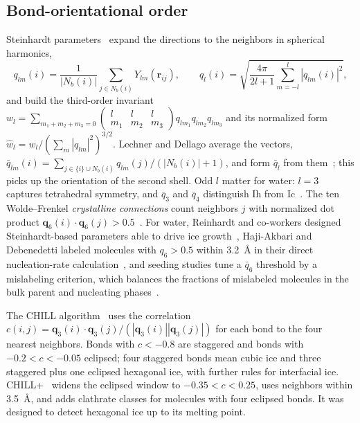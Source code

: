 \documentclass[11pt,a4paper]{article}
\begin{document}
\subsection{Bond-orientational order}\label{sec:boo}
Steinhardt parameters~\cite{Steinhardt1983} expand the directions to the
neighbors in spherical harmonics,
\begin{equation}
  q_{lm}(i)=\frac{1}{|N_b(i)|}\sum_{j\in N_b(i)}Y_{lm}(\hat{\mathbf r}_{ij}),\qquad
  q_l(i)=\sqrt{\frac{4\pi}{2l+1}\sum_{m=-l}^{l}|q_{lm}(i)|^2},
\end{equation}
and build the third-order invariant
$w_l=\sum_{m_1+m_2+m_3=0}\begin{pmatrix}l&l&l\\m_1&m_2&m_3\end{pmatrix}q_{lm_1}q_{lm_2}q_{lm_3}$
and its normalized form $\hat w_l=w_l/(\sum_m|q_{lm}|^2)^{3/2}$. Lechner and
Dellago average the vectors,
$\bar q_{lm}(i)=\sum_{j\in\{i\}\cup N_b(i)}q_{lm}(j)/(|N_b(i)|+1)$, and form
$\bar q_l$ from them~\cite{Lechner2008}; this picks up the orientation of the
second shell. Odd $l$ matter for water: $l=3$ captures tetrahedral symmetry,
and $\bar q_3$ and $\bar q_4$ distinguish Ih from Ic~\cite{Benet2014,Doi2021}.
The ten Wolde--Frenkel \emph{crystalline connections} count neighbors $j$ with
normalized dot product $\mathbf q_6(i)\cdot\mathbf q_6(j)>0.5$~\cite{tenWolde1996}.
For water, Reinhardt and co-workers designed Steinhardt-based parameters able
to drive ice growth~\cite{Reinhardt2012}, Haji-Akbari and Debenedetti
labeled molecules with $q_6>0.5$ within 3.2~\AA{} in their direct
nucleation-rate calculation~\cite{HajiAkbari2015}, and seeding studies tune a
$\bar q_6$ threshold by a mislabeling criterion, which balances the fractions
of mislabeled molecules in the bulk parent and nucleating
phases~\cite{Espinosa2016,Lamas2021}.

The CHILL algorithm~\cite{Moore2010} uses the correlation
$c(i,j)=\mathbf q_3(i)\cdot\mathbf q_3(j)/(|\mathbf q_3(i)||\mathbf q_3(j)|)$
for each bond to the four nearest neighbors. Bonds with $c<-0.8$ are
staggered and bonds with $-0.2<c<-0.05$ eclipsed; four staggered bonds mean
cubic ice and three staggered plus one eclipsed hexagonal ice, with further
rules for interfacial ice. CHILL+~\cite{Nguyen2014} widens the eclipsed window
to $-0.35<c<0.25$, uses neighbors within 3.5~\AA, and adds clathrate classes
for molecules with four eclipsed bonds. It was designed to detect hexagonal
ice up to its melting point.
\end{document}
